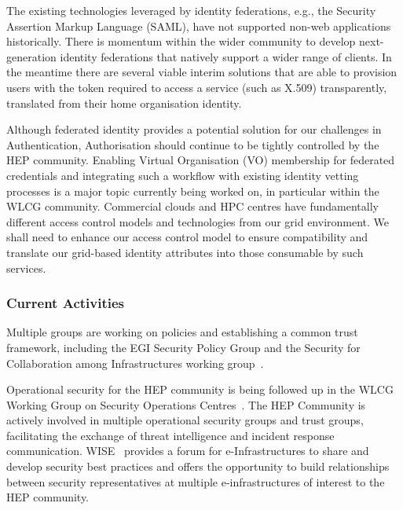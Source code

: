 \documentclass[twocolumn]{svjour3}          %
\begin{document}
The existing technologies leveraged by identity federations, e.g., the
Security Assertion Markup Language (SAML), have not supported non-web
applications historically. There is momentum within the wider community
to develop next-generation identity federations that natively support a
wider range of clients. In the meantime there are several viable interim
solutions that are able to provision users with the token required to
access a service (such as X.509) transparently, translated from their
home organisation identity.

Although federated identity provides a potential solution for our
challenges in Authentication, Authorisation should continue to be
tightly controlled by the HEP community. Enabling Virtual Organisation
(VO) membership for federated credentials and integrating such a
workflow with existing identity vetting processes is a major topic
currently being worked on, in particular within the WLCG community.
Commercial clouds and HPC centres have fundamentally different access
control models and technologies from our grid environment. We shall need
to enhance our access control model to ensure compatibility and
translate our grid-based identity attributes into those consumable by
such services.

\subsubsection*{Current Activities}

Multiple groups are working on policies and establishing a common trust
framework, including the EGI Security Policy Group
\cite{EGISecurityPolicyGroup} and the Security for Collaboration among
Infrastructures working group~\cite{SCI_WG}.

Operational security for the HEP community is being followed up in the
WLCG Working Group on Security Operations Centres~\cite{WLCG-SOC-WG}. The
HEP Community is actively involved in multiple operational security
groups and trust groups, facilitating the exchange of threat
intelligence and incident response communication. WISE~\cite{WISE}
provides a forum for e-Infrastructures to share and develop security
best practices and offers the opportunity to build relationships between
security representatives at multiple e-infrastructures of interest to
the HEP community.
\end{document}
